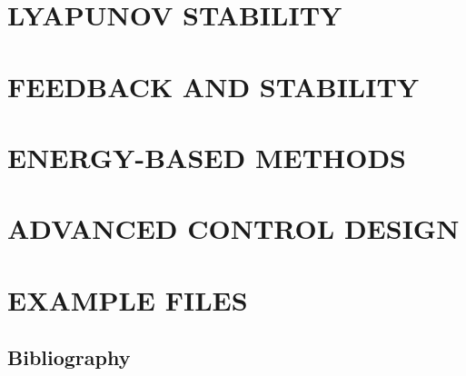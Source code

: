 \documentclass[
	11pt, %
	fleqn, %
	a4paper, %
]{LegrandOrangeBook}
\begin{document}
\part{LYAPUNOV STABILITY}



\part{FEEDBACK AND STABILITY}




\part{ENERGY-BASED METHODS}

\part{ADVANCED CONTROL DESIGN}

\part{EXAMPLE FILES}





\stopcontents[part] %


\chapterimage{} %
\chapterspaceabove{2.5cm} %
\chapterspacebelow{2cm} %


\chapter*{Bibliography}
\end{document}
